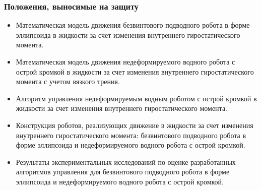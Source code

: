 \begin{frame}
    \frametitle{Положения, выносимые на защиту}
\small    
    \begin{itemize}
        \item Математическая модель движения безвинтового подводного робота в форме эллипсоида в жидкости за счет изменения внутреннего гиростатического момента.
        \item Математическая модель движения недеформируемого водного робота с острой кромкой в жидкости за счет изменения внутреннего гиростатического момента с учетом вязкого трения.
        \item Алгоритм управления недеформируемым водным роботом с острой кромкой в жидкости за счет изменения внутреннего гиростатического момента.
        \item Конструкция роботов, реализующих движение в жидкости за счет изменения внутреннего гиростатического момента:  безвинтового подводного робота в форме эллипсоида и недеформируемого водного робота с острой кромкой.
        \item Результаты экспериментальных исследований по оценке разработанных алгоритмов управления для безвинтового подводного робота в форме эллипсоида и недеформируемого водного робота с острой кромкой.        
    \end{itemize}
\end{frame}
%
%
%
%
%
